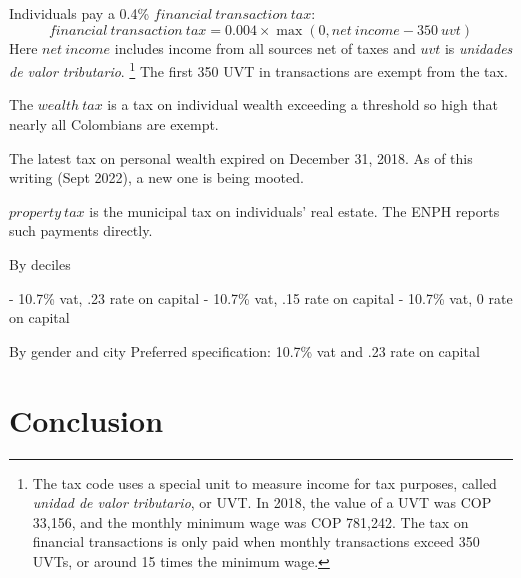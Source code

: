 \documentclass[12pt]{article}
\begin{document}
Individuals pay a 0.4\% $financial\ transaction\ tax$:
\begin{equation} financial\ transaction\ tax =
    0.004 \times \max (0, net\ income -350\ uvt)
    \iffalse [[
        We could, alternatively, write that using cases:
          \begin{cases}
            0.004 \times (net\ income -350\ uvt) & net\ income > 350 uvt \\
            0                                    & net\ income <= 350 uvt
          \end{cases}
          but I (Jeff) find it easier harder to read without cases. ]]
    \fi
\end{equation}
Here $net\ income$ includes income from all sources net of taxes
and $uvt$ is \textit{unidades de valor tributario}.
  \footnote{
  The tax code uses a special unit to measure income for tax purposes,
  called \textit{unidad de valor tributario}, or UVT.
  In 2018, the value of a UVT was COP 33,156,
  and the monthly minimum wage was COP 781,242.
  The tax on financial transactions is only paid
  when monthly transactions exceed 350 UVTs,
  or around 15 times the minimum wage.}
The first 350 UVT in transactions are exempt from the tax.

The $wealth\ tax$ is a tax on individual wealth
exceeding a threshold so high that nearly all Colombians are exempt.
\iffalse [[ AN ECONOMIST or A LAWYER:
    This is out of date. What happened? --jbb ]]
\fi
The latest tax on personal wealth expired on December 31, 2018.
As of this writing (Sept 2022), a new one is being mooted.

$property\ tax$ is the municipal tax on individuals' real estate.
The ENPH reports such payments directly.

\iffalse JEFF: RESUME HERE \fi

\iffalse
[[ AN ECONOMIST:
    What does this next passage mean?
    It looks like it got mangled.
    --jbb]]
\fi

By deciles

- 10.7\% vat, .23 rate on capital
- 10.7\% vat, .15 rate on capital
- 10.7\% vat,  0 rate on capital

By gender and city
Preferred specification: 10.7\% vat and .23 rate on capital

\section{Conclusion}

\citet{microsim}
\end{document}
